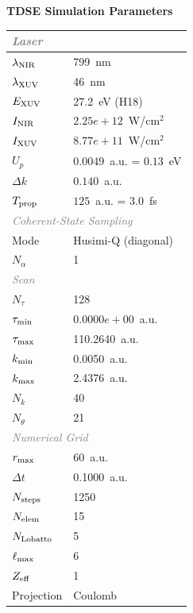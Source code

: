 \documentclass[11pt]{article}
\begin{document}

\begin{center}
  \Large\textbf{TDSE Simulation Parameters}
\end{center}
\vspace{4pt}

\begin{tabular}{@{}ll@{}}
  \toprule
  \multicolumn{2}{l}{\small\textit{\textcolor{gray}{Laser}}} \\
  \hline
  $\lambda_{\rm NIR}$ & 799~nm \\
  $\lambda_{\rm XUV}$ & 46~nm \\
  $E_{\rm XUV}$ & 27.2~eV (H18) \\
  $I_{\rm NIR}$ & $2.25e+12$~W/cm$^2$ \\
  $I_{\rm XUV}$ & $8.77e+11$~W/cm$^2$ \\
  $U_p$ & $0.0049$~a.u. = $0.13$~eV \\
  $\Delta k$ & $0.140$~a.u. \\
  $T_{\rm prop}$ & $125$~a.u. = $3.0$~fs \\
  \multicolumn{2}{l}{\small\textit{\textcolor{gray}{Coherent-State Sampling}}} \\
  \hline
  Mode & Husimi-Q (diagonal) \\
  $N_{\alpha}$ & 1 \\
  \multicolumn{2}{l}{\small\textit{\textcolor{gray}{Scan}}} \\
  \hline
  $N_{\tau}$ & 128 \\
  $\tau_{\rm min}$ & $0.0000e+00$~a.u. \\
  $\tau_{\rm max}$ & 110.2640~a.u. \\
  $k_{\rm min}$ & 0.0050~a.u. \\
  $k_{\rm max}$ & 2.4376~a.u. \\
  $N_k$ & 40 \\
  $N_{\theta}$ & 21 \\
  \multicolumn{2}{l}{\small\textit{\textcolor{gray}{Numerical Grid}}} \\
  \hline
  $r_{\rm max}$ & 60~a.u. \\
  $\Delta t$ & 0.1000~a.u. \\
  $N_{\rm steps}$ & 1250 \\
  $N_{\rm elem}$ & 15 \\
  $N_{\rm Lobatto}$ & 5 \\
  $\ell_{\rm max}$ & 6 \\
  $Z_{\rm eff}$ & 1 \\
  Projection & Coulomb \\
  \bottomrule
\end{tabular}
\end{document}
